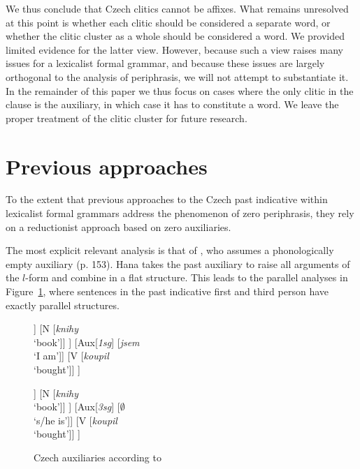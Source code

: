 \documentclass[output=paper]{langsci/langscibook}
\begin{document}
We thus conclude that Czech clitics cannot be affixes.
What remains unresolved at this point is whether each clitic should be considered a separate word, or whether the clitic cluster as a whole should be considered a word. We provided limited evidence for the latter view. However, because such a view raises many issues for a lexicalist formal grammar, and because these issues are largely orthogonal to the analysis of periphrasis, we will not attempt to substantiate it. In the remainder of this paper we thus focus on cases where the only clitic in the clause is the auxiliary, in which case it has to constitute a word. We leave the proper treatment of the clitic cluster for future research.


\section{Previous approaches}
\label{sec:previous}
To the extent that previous approaches to the Czech past indicative within lexicalist formal grammars  address the phenomenon of zero periphrasis, they rely on a reductionist approach based on zero auxiliaries.

The most explicit relevant analysis is that of \citet{Hana07}, who  assumes a phonologically empty auxiliary (p. 153). Hana takes the past auxiliary to raise all arguments of the $l$-form and combine in a flat structure. This leads to the parallel analyses in Figure~\ref{fig:hana}, where sentences in the past indicative first and third person have exactly parallel structures.  

\begin{figure}
\begin{forest}
[S
	[NP	
		[A [\textit{ty}\\‘this’]]
		[N [\textit{knihy}\\‘book’]]
    ]
	[Aux{[}\textit{1sg}{]} [\textit{jsem}\\‘I am’]]
    [V [\textit{koupil}\\‘bought’]]
]
\end{forest}
\hfill
\begin{forest}
[S
    [NP
		[A [\textit{ty}\\‘this’]]
		[N [\textit{knihy}\\‘book’]]
    ]
		[Aux{[}\textit{3sg}{]} [$\emptyset$\\‘s/he is’]]
		[V [\textit{koupil}\\‘bought’]]
]
\end{forest}
\caption{Czech auxiliaries according to \citet{Hana07}\label{fig:hana}}
\end{figure}
\end{document}
